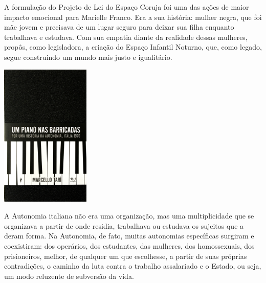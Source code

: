 {\medskip

\noindent{}A formulação do Projeto de Lei do Espaço Coruja foi uma das ações de maior impacto emocional para Marielle Franco. Era a sua história: mulher negra, que foi mãe jovem e precisava de um lugar seguro para deixar sua filha enquanto trabalhava e estudava. Com sua empatia diante da realidade dessas mulheres, propôs, como legisladora, a criação do Espaço Infantil Noturno, que, como legado, segue construindo um mundo mais justo e igualitário.

\vfill

\hspace*{-.4cm}\begin{minipage}[c]{1\linewidth}
\small{
{}}
\end{minipage}

\pagebreak

\hspace{.5cm}

\begin{center}
\hspace*{-.5cm}\includegraphics[width=42.5mm]{./imgs/barricada.png}
\end{center}

\hspace*{-7cm}\hrulefill\hspace*{-7cm}

\medskip

\noindent{}A Autonomia italiana não era uma organização, mas uma multiplicidade que se organizava a partir de onde residia, trabalhava ou estudava os sujeitos que a deram forma. Na Autonomia, de fato, muitas autonomias específicas surgiram e coexistiram: dos operários, dos estudantes, das mulheres, dos homossexuais, dos prisioneiros, melhor, de qualquer um que escolhesse, a partir de suas próprias contradições, o caminho da luta contra o trabalho assalariado e o Estado, ou seja, um modo reluzente de subversão da vida.

}
